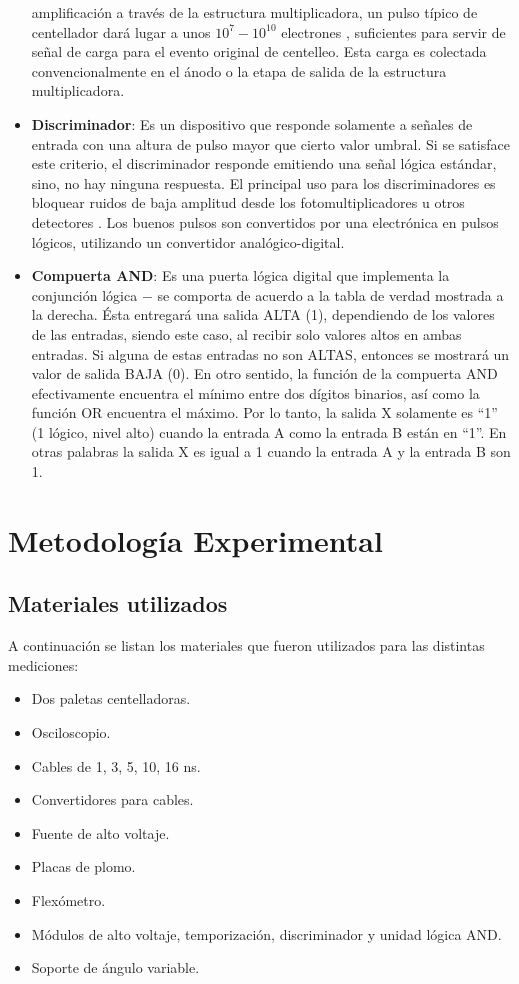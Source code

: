 \documentclass[a4paper,10pt]{article}
\numberwithin{equation}{section}
\begin{document}
\begin{itemize}
 amplificación a través de la estructura multiplicadora, un pulso típico de
 centellador dará lugar a unos $10^7-10^{10}$ electrones \cite{knoll}, suficientes
 para servir de señal de carga para el evento original de centelleo. Esta carga
 es colectada convencionalmente en el ánodo o la etapa de salida de la estructura
 multiplicadora.
 \item \textbf{Discriminador}: Es un dispositivo que responde solamente a señales 
 de entrada con una altura de pulso mayor que cierto valor umbral. Si se satisface 
 este criterio, el discriminador responde emitiendo una señal lógica estándar, sino, 
 no hay ninguna respuesta. El principal uso para los discriminadores es bloquear 
 ruidos de baja amplitud desde los fotomultiplicadores u otros detectores \cite{leo}. Los 
 buenos pulsos son convertidos por una electrónica en pulsos lógicos, utilizando 
 un convertidor analógico-digital.
 \item \textbf{Compuerta AND}: Es una puerta lógica digital que implementa la
 conjunción lógica $-$ se comporta de acuerdo a la tabla de verdad mostrada a la 
 derecha. Ésta entregará una salida ALTA (1), dependiendo de los valores de las 
 entradas, siendo este caso, al recibir solo valores altos en ambas entradas. Si 
 alguna de estas entradas no son ALTAS, entonces se mostrará un valor de salida 
 BAJA (0). En otro sentido, la función de la compuerta AND efectivamente encuentra 
 el mínimo entre dos dígitos binarios, así como la función OR encuentra el máximo.
 Por lo tanto, la salida X solamente es ``1'' (1 lógico, nivel alto) cuando la entrada
 A como la entrada B están en ``1''. En otras palabras la salida X es igual a 1 cuando
 la entrada A y la entrada B son 1.
\end{itemize}


\section{Metodología Experimental}

\subsection{Materiales utilizados}
\label{ss:materialesutilizados}

A continuación se listan los materiales que fueron utilizados para las distintas mediciones:

\begin{itemize}
 \item Dos paletas centelladoras.
 \item Osciloscopio.
 \item Cables de 1, 3, 5, 10, 16 ns.
 \item Convertidores para cables.
 \item Fuente de alto voltaje.
 \item Placas de plomo.
 \item Flexómetro.
 \item Módulos de alto voltaje, temporización, discriminador y unidad lógica AND.
 \item Soporte de ángulo variable.
\end{itemize}
\end{document}
